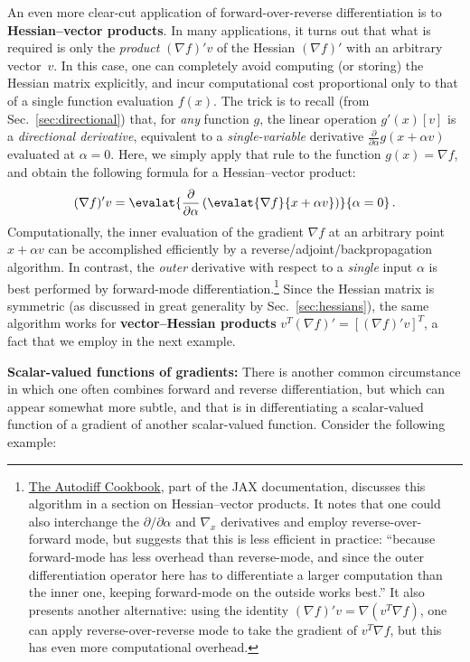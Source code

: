 An even more clear-cut application of forward-over-reverse differentiation is to \textbf{Hessian--vector products}.  In many applications, it turns out that what is required is only the \emph{product} $(\nabla f)' v$ of the Hessian $(\nabla f)'$ with an arbitrary vector~$v$.  In this case, one can completely avoid computing (or storing) the Hessian matrix explicitly, and incur computational cost proportional only to that of  a single function evaluation $f(x)$.  The trick is to recall (from Sec.~\ref{sec:directional}) that, for \emph{any} function $g$, the linear operation $g'(x)[v]$ is a \emph{directional derivative}, equivalent to a \emph{single-variable} derivative $\frac{\partial}{\partial\alpha} g(x+\alpha v)$ evaluated at $\alpha = 0$.  Here, we simply apply that rule to the function $g(x) = \nabla f$, and obtain the following formula for a Hessian--vector product:
$$
(\nabla f)' v = \evalat{\frac{\partial}{\partial\alpha} \left( \evalat{\nabla f}{x + \alpha v} \right)}{\alpha=0} \, .
$$
Computationally, the inner evaluation of the gradient $\nabla f$ at an arbitrary point $x + \alpha v$ can be accomplished efficiently by a reverse/adjoint/backpropagation algorithm.  In contrast, the \emph{outer} derivative with respect to a \emph{single} input $\alpha$ is best performed by forward-mode differentiation.\footnote{\href{https://jax.readthedocs.io/en/latest/notebooks/autodiff_cookbook.html}{The Autodiff Cookbook}, part of the JAX documentation, discusses this algorithm in a section on Hessian--vector products.  It notes that one could also interchange the $\partial/\partial \alpha$ and $\nabla_x$ derivatives and employ reverse-over-forward mode, but suggests that this is less efficient in practice: ``because forward-mode has less overhead than reverse-mode, and since the outer differentiation operator here has to differentiate a larger computation than the inner one, keeping forward-mode on the outside works best.'' It also presents another alternative: using the identity $(\nabla f)'v = \nabla (v^T \nabla f)$, one can apply reverse-over-reverse mode to take the gradient of $v^T \nabla f$, but this has even more computational overhead.}   
Since the Hessian matrix is symmetric (as discussed in great generality by Sec.~\ref{sec:hessians}), the same algorithm works for \textbf{vector--Hessian products} $v^T (\nabla f)' = [(\nabla f)' v]^T$, a fact that we employ in the next example.


\textbf{Scalar-valued functions of gradients:} There is another common circumstance in which one often combines forward and reverse differentiation, but which can appear somewhat more subtle, and that is in differentiating a scalar-valued function of a gradient of another scalar-valued function.  Consider the following example: 

